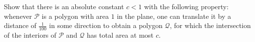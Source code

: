Show that there is an absolute constant $c<1$ with the following property: whenever $\mathcal{P}$ is a polygon with area $1$ in the plane, one can translate it by a distance of $\frac{1}{100}$ in some direction to obtain a polygon $\mathcal{Q}$, for which the intersection of the interiors of $\mathcal{P}$ and $\mathcal{Q}$  has total area at most $c$.